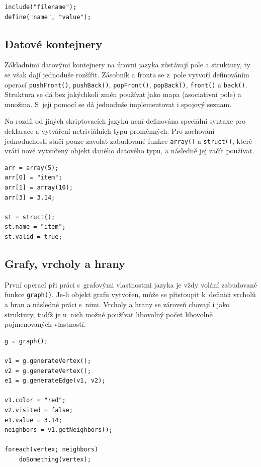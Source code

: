 \documentclass[11pt,twoside,a4paper]{book}
\begin{document}
\begin{verbatim}
include("filename");
define("name", "value");
\end{verbatim}


\subsection{Datové kontejnery}

Základními datovými kontejnery na úrovni jazyka zůstávají pole a struktury, ty se však dají jednoduše rozšířit. Zásobník a fronta se z~pole vytvoří definováním operací \texttt{pushFront()}, \texttt{push\-Back()}, \texttt{popFront()}, \texttt{popBack()}, \texttt{front()} a \texttt{back()}. Struktura se dá bez jakýchkoli změn po\-u\-ží\-vat jako mapa (asociativní pole) a množina. S~její pomocí se dá jednoduše implementovat i spojový seznam.

Na rozdíl od jiných skriptovacích jazyků není definována speciální syntaxe pro deklarace a vytváření netriviálních typů proměnných. Pro zachování jednoduchosti stačí pouze zavolat zabudované funkce \texttt{array()} a \texttt{struct()}, které vrátí nově vytvořený objekt daného datového typu, a ná\-sled\-ně jej začít používat.

\begin{verbatim}
arr = array(5);
arr[0] = "item";
arr[1] = array(10);
arr[3] = 3.14;

st = struct();
st.name = "item";
st.valid = true;
\end{verbatim}


\subsection{Grafy, vrcholy a hrany}

První operací při práci s~grafovými vlastnostmi jazyka je vždy volání zabudované funkce \texttt{graph()}. Je-li objekt grafu vytvořen, může se přistoupit k~definici vrcholů a hran a následné práci s~nimi. Vrcholy a hrany se zároveň chovají i jako struktury, tudíž je u~nich možné používat libovolný počet libovolně pojmenovaných vlastností.

\begin{verbatim}
g = graph();

v1 = g.generateVertex();
v2 = g.generateVertex();
e1 = g.generateEdge(v1, v2);

v1.color = "red";
v2.visited = false;
e1.value = 3.14;
neighbors = v1.getNeighbors();

foreach(vertex; neighbors)
    doSomething(vertex);
\end{verbatim}
\end{document}
